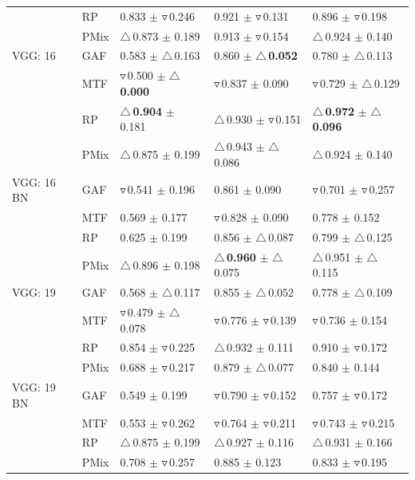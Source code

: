 \documentclass[final,3p,times,twocolumn]{elsarticle}
\newcommand{\purpole}[1]{\textcolor[rgb]{0.7,0.2,0.7}{#1}}
\begin{document}
\begin{table}[t!]
{\begin{tabular}{lllll}
 & RP & 0.833 $\pm$ $\triangledown$\,0.246 & 0.921 $\pm$ $\triangledown$\,0.131 & 0.896 $\pm$ $\triangledown$\,0.198 \\
 & \purpole{PMix} & $\triangle$\,0.873 $\pm$ 0.189 & 0.913 $\pm$ $\triangledown$\,0.154 & $\triangle$\,0.924 $\pm$ 0.140 \\
VGG: 16 & GAF & 0.583 $\pm$ $\triangle$\,0.163 & 0.860 $\pm$ \textbf{$\triangle$\,0.052} & 0.780 $\pm$ $\triangle$\,0.113 \\
 & MTF & $\triangledown$\,0.500 $\pm$ \textbf{$\triangle$\,0.000} & $\triangledown$\,0.837 $\pm$ 0.090 & $\triangledown$\,0.729 $\pm$ $\triangle$\,0.129 \\
 & RP & \textbf{$\triangle$\,0.904} $\pm$ 0.181 & $\triangle$\,0.930 $\pm$ $\triangledown$\,0.151 & \textbf{$\triangle$\,0.972} $\pm$ \textbf{$\triangle$\,0.096} \\
 & \purpole{PMix} & $\triangle$\,0.875 $\pm$ 0.199 & $\triangle$\,0.943 $\pm$ $\triangle$\,0.086 & $\triangle$\,0.924 $\pm$ 0.140 \\
VGG: 16 BN & GAF & $\triangledown$\,0.541 $\pm$ 0.196 & 0.861 $\pm$ 0.090 & $\triangledown$\,0.701 $\pm$ $\triangledown$\,0.257 \\
 & MTF & 0.569 $\pm$ 0.177 & $\triangledown$\,0.828 $\pm$ 0.090 & 0.778 $\pm$ 0.152 \\
 & RP & 0.625 $\pm$ 0.199 & 0.856 $\pm$ $\triangle$\,0.087 & 0.799 $\pm$ $\triangle$\,0.125 \\
 & \purpole{PMix} & $\triangle$\,0.896 $\pm$ 0.198 & \textbf{$\triangle$\,0.960} $\pm$ $\triangle$\,0.075 & $\triangle$\,0.951 $\pm$ $\triangle$\,0.115 \\
VGG: 19 & GAF & 0.568 $\pm$ $\triangle$\,0.117 & 0.855 $\pm$ $\triangle$\,0.052 & 0.778 $\pm$ $\triangle$\,0.109 \\
 & MTF & $\triangledown$\,0.479 $\pm$ $\triangle$\,0.078 & $\triangledown$\,0.776 $\pm$ $\triangledown$\,0.139 & $\triangledown$\,0.736 $\pm$ 0.154 \\
 & RP & 0.854 $\pm$ $\triangledown$\,0.225 & $\triangle$\,0.932 $\pm$ 0.111 & 0.910 $\pm$ $\triangledown$\,0.172 \\
 & \purpole{PMix} & 0.688 $\pm$ $\triangledown$\,0.217 & 0.879 $\pm$ $\triangle$\,0.077 & 0.840 $\pm$ 0.144 \\
VGG: 19 BN & GAF & 0.549 $\pm$ 0.199 & $\triangledown$\,0.790 $\pm$ $\triangledown$\,0.152 & 0.757 $\pm$ $\triangledown$\,0.172 \\
 & MTF & 0.553 $\pm$ $\triangledown$\,0.262 & $\triangledown$\,0.764 $\pm$ $\triangledown$\,0.211 & $\triangledown$\,0.743 $\pm$ $\triangledown$\,0.215 \\
 & RP & $\triangle$\,0.875 $\pm$ 0.199 & $\triangle$\,0.927 $\pm$ 0.116 & $\triangle$\,0.931 $\pm$ 0.166 \\
 & \purpole{PMix} & 0.708 $\pm$ $\triangledown$\,0.257 & 0.885 $\pm$ 0.123 & 0.833 $\pm$ $\triangledown$\,0.195 \\
\bottomrule
\end{tabular}
    }
\end{table}
\end{document}
